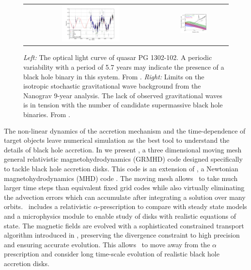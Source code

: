 \begin{figure}
\begin{center}
\begin{tabular}{cc}
\includegraphics[width=0.45\textwidth]{figures/pg1302.pdf} & \includegraphics[width=0.4\textwidth]{figures/nanograv.pdf}
\end{tabular}
\end{center}
\caption{\emph{Left:} The optical light curve of quasar PG 1302-102.  A periodic variability with a period of 5.7 years may indicate the presence of a black hole binary in this system. From \cite{Graham15A}. \emph{Right:} Limits on the isotropic stochastic gravitational wave background from the Nanograv 9-year analysis.  The lack of observed gravitational waves is in tension with the number of candidate supermassive black hole binaries.  From \cite{NanogravLimits}. }
\end{figure}

The non-linear dynamics of the accretion mechanism and the time-dependence of target objects leave numerical simulation as the best tool to understand the details of black hole accretion.  In  we present \grdisco, a three dimensional moving mesh general relativistic magnetohydrodynamics (GRMHD) code designed specifically to tackle black hole accretion disks.  This code is an extension of \disco, a Newtonian magnetohydrodynamics (MHD) code \citep{Duffell16}.  The moving mesh allows \disco\ to take much larger time steps than equivalent fixed grid codes while also virtually eliminating the advection errors which can accumulate after integrating a solution over many orbits.  \grdisco\ includes a relativistic $\alpha$-prescription to compare with steady state models and a microphysics module to enable study of disks with realistic equations of state.  The magnetic fields are evolved with a sophisticated constrained transport algorithm introduced in \cite{Duffell16}, preserving the divergence constraint to high precision and ensuring accurate evolution.  This allows \discogr\ to move away from the $\alpha$ prescription and consider long time-scale evolution of realistic black hole accretion disks.  

